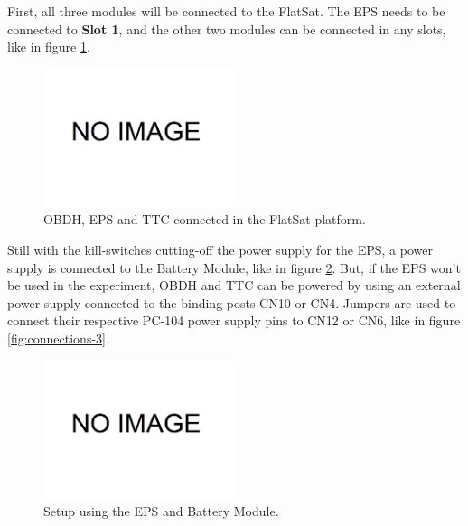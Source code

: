First, all three modules will be connected to the FlatSat. The EPS needs to be connected to \textbf{Slot 1}, and the other two modules can be connected in any slots, like in figure \ref{fig:connections-1}.

\begin{figure}[H]
	\begin{center}
		\includegraphics[width=0.5\textwidth]{figures/dummy-image.png}
		\caption{OBDH, EPS and TTC connected in the FlatSat platform.}
		\label{fig:connections-1}
	\end{center}
\end{figure}

Still with the kill-switches cutting-off the power supply for the EPS, a power supply is connected to the Battery Module, like in figure \ref{fig:connections-2}. But, if the EPS won't be used in the experiment, OBDH and TTC can be powered by using an external power supply connected to the binding posts CN10 or CN4. Jumpers are used to connect their respective PC-104 power supply pins to CN12 or CN6, like in figure \ref{fig:connections-3}. 

\begin{figure}[H]
	\begin{center}
		\includegraphics[width=0.5\textwidth]{figures/dummy-image.png}
		\caption{Setup using the EPS and Battery Module.}
		\label{fig:connections-2}
	\end{center}
\end{figure}

